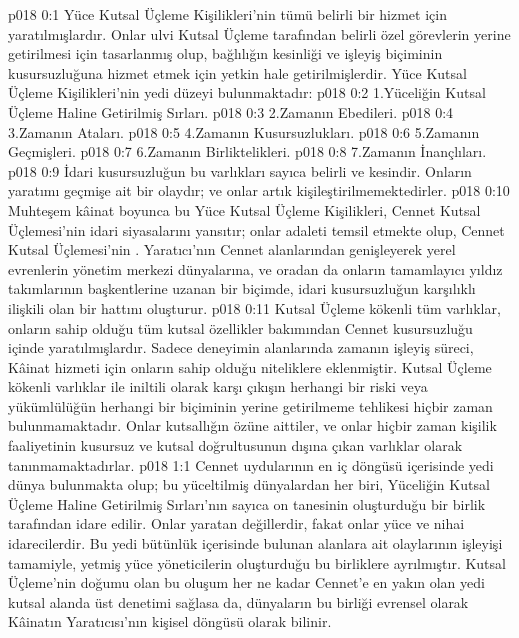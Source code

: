 \vs p018 0:1 Yüce Kutsal Üçleme Kişilikleri’nin tümü belirli bir hizmet için yaratılmışlardır. Onlar ulvi Kutsal Üçleme tarafından belirli özel görevlerin yerine getirilmesi için tasarlanmış olup, bağlılığın kesinliği ve işleyiş biçiminin kusursuzluğuna hizmet etmek için yetkin hale getirilmişlerdir. Yüce Kutsal Üçleme Kişilikleri’nin yedi düzeyi bulunmaktadır:
\vs p018 0:2 1.\bibnobreakspace Yüceliğin Kutsal Üçleme Haline Getirilmiş Sırları.
\vs p018 0:3 2.\bibnobreakspace Zamanın Ebedileri.
\vs p018 0:4 3.\bibnobreakspace Zamanın Ataları.
\vs p018 0:5 4.\bibnobreakspace Zamanın Kusursuzlukları.
\vs p018 0:6 5.\bibnobreakspace Zamanın Geçmişleri.
\vs p018 0:7 6.\bibnobreakspace Zamanın Birliktelikleri.
\vs p018 0:8 7.\bibnobreakspace Zamanın İnançlıları.
\vs p018 0:9 İdari kusursuzluğun bu varlıkları sayıca belirli ve kesindir. Onların yaratımı geçmişe ait bir olaydır; ve onlar artık kişileştirilmemektedirler.
\vs p018 0:10 Muhteşem kâinat boyunca bu Yüce Kutsal Üçleme Kişilikleri, Cennet Kutsal Üçlemesi’nin idari siyasalarını yansıtır; onlar adaleti temsil etmekte olup, Cennet Kutsal Üçlemesi’nin . Yaratıcı’nın Cennet alanlarından genişleyerek yerel evrenlerin yönetim merkezi dünyalarına, ve oradan da onların tamamlayıcı yıldız takımlarının başkentlerine uzanan bir biçimde, idari kusursuzluğun karşılıklı ilişkili olan bir hattını oluşturur.
\vs p018 0:11 Kutsal Üçleme kökenli tüm varlıklar, onların sahip olduğu tüm kutsal özellikler bakımından Cennet kusursuzluğu içinde yaratılmışlardır. Sadece deneyimin alanlarında zamanın işleyiş süreci, Kâinat hizmeti için onların sahip olduğu niteliklere eklenmiştir. Kutsal Üçleme kökenli varlıklar ile iniltili olarak karşı çıkışın herhangi bir riski veya yükümlülüğün herhangi bir biçiminin yerine getirilmeme tehlikesi hiçbir zaman bulunmamaktadır. Onlar kutsallığın özüne aittiler, ve onlar hiçbir zaman kişilik faaliyetinin kusursuz ve kutsal doğrultusunun dışına çıkan varlıklar olarak tanınmamaktadırlar.
\vs p018 1:1 Cennet uydularının en iç döngüsü içerisinde yedi dünya bulunmakta olup; bu yüceltilmiş dünyalardan her biri, Yüceliğin Kutsal Üçleme Haline Getirilmiş Sırları’nın sayıca on tanesinin oluşturduğu bir birlik tarafından idare edilir. Onlar yaratan değillerdir, fakat onlar yüce ve nihai idarecilerdir. Bu yedi bütünlük içerisinde bulunan alanlara ait olaylarının işleyişi tamamiyle, yetmiş yüce yöneticilerin oluşturduğu bu birliklere ayrılmıştır. Kutsal Üçleme’nin doğumu olan bu oluşum her ne kadar Cennet’e en yakın olan yedi kutsal alanda üst denetimi sağlasa da, dünyaların bu birliği evrensel olarak Kâinatın Yaratıcısı’nın kişisel döngüsü olarak bilinir.
